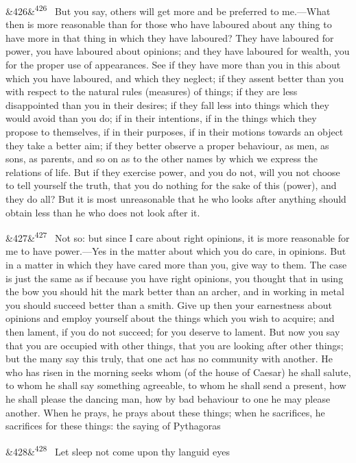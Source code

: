 \documentclass[12pt]{article}
\newcommand{\para}[1][]{\par\noindent\ifx&#1&\else\textsuperscript{\footnotesize #1}~\fi}
\begin{document}
\para[426] But you say, others will get more and be preferred to me.—What then is more reasonable than for those who have laboured about any thing to have more in that thing in which they have laboured? They have laboured for power, you have laboured about opinions; and they have laboured for wealth, you for the proper use of appearances. See if they have more than you in this about which you have laboured, and which they neglect; if they assent better than you with respect to the natural rules (measures) of things; if they are less disappointed than you in their desires; if they fall less into things which they would avoid than you do; if in their intentions, if in the things which they propose to themselves, if in their purposes, if in their motions towards an object they take a better aim; if they better observe a proper behaviour, as men, as sons, as parents, and so on as to the other names by which we express the relations of life. But if they exercise power, and you do not, will you not choose to tell yourself the truth, that you do nothing for the sake of this (power), and they do all? But it is most unreasonable that he who looks after anything should obtain less than he who does not look after it.

\para[427] Not so: but since I care about right opinions, it is more reasonable for me to have power.—Yes in the matter about which you do care, in opinions. But in a matter in which they have cared more than you, give way to them. The case is just the same as if because you have right opinions, you thought that in using the bow you should hit the mark better than an archer, and in working in metal you should succeed better than a smith. Give up then your earnestness about opinions and employ yourself about the things which you wish to acquire; and then lament, if you do not succeed; for you deserve to lament. But now you say that you are occupied with other things, that you are looking after other things; but the many say this truly, that one act has no community with another. He who has risen in the morning seeks whom (of the house of Caesar) he shall salute, to whom he shall say something agreeable, to whom he shall send a present, how he shall please the dancing man, how by bad behaviour to one he may please another. When he prays, he prays about these things; when he sacrifices, he sacrifices for these things: the saying of Pythagoras

\para[428] Let sleep not come upon thy languid eyes
\end{document}
